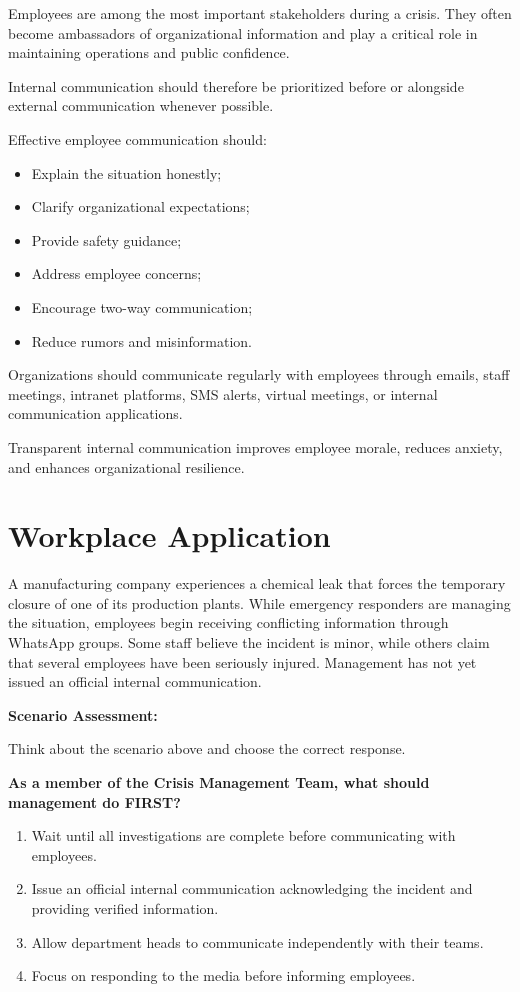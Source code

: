 \documentclass[10pt]{article}
\begin{document}
Employees are among the most important stakeholders during a crisis. They often become ambassadors of organizational information and play a critical role in maintaining operations and public confidence.

Internal communication should therefore be prioritized before or alongside external communication whenever possible.

Effective employee communication should:
\begin{itemize}
    \item Explain the situation honestly;
    \item Clarify organizational expectations;
    \item Provide safety guidance;
    \item Address employee concerns;
    \item Encourage two-way communication;
    \item Reduce rumors and misinformation.
\end{itemize}

Organizations should communicate regularly with employees through emails, staff meetings, intranet platforms, SMS alerts, virtual meetings, or internal communication applications.

Transparent internal communication improves employee morale, reduces anxiety, and enhances organizational resilience.

\section*{Workplace Application}

A manufacturing company experiences a chemical leak that forces the temporary closure of one of its production plants. While emergency responders are managing the situation, employees begin receiving conflicting information through WhatsApp groups. Some staff believe the incident is minor, while others claim that several employees have been seriously injured. Management has not yet issued an official internal communication.

\textbf{Scenario Assessment:}

Think about the scenario above and choose the correct response.

\textbf{As a member of the Crisis Management Team, what should management do FIRST?}

\begin{enumerate}[label=\alph*)]
    \item Wait until all investigations are complete before communicating with employees.
    \item Issue an official internal communication acknowledging the incident and providing verified information.
    \item Allow department heads to communicate independently with their teams.
    \item Focus on responding to the media before informing employees.
\end{enumerate}
\end{document}
